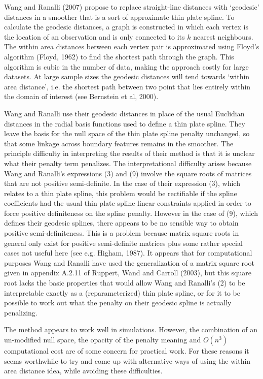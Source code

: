 \documentclass[useAMS, referee]{biom}
\begin{document}
Wang and Ranalli (2007) propose to replace straight-line distances with `geodesic' distances in a smoother that is a sort of approximate thin plate spline. To calculate the geodesic distances, a graph is constructed in which each vertex is the location of an observation and is only connected to its $k$ nearest neighbours. The within area distances between each vertex pair is approximated using  Floyd's algorithm (Floyd, 1962) to find the shortest path through the graph. This algorithm is cubic in the number of data, making the approach costly for large datasets. At large sample sizes the geodesic distances will tend towards `within area distance', i.e. the shortest path between two point that lies entirely within the domain of interest (see Bernstein et al, 2000). 

Wang and Ranalli use their geodesic distances in place of the usual Euclidian distances in the radial basis functions used to define a thin plate spline. They leave the basis for the null space of the thin plate spline penalty unchanged, so that some linkage across boundary features remains in the smoother. The principle difficulty in interpreting the results of their method is that it is unclear what their penalty term penalizes. The interpretational difficulty arises because  Wang and Ranalli's expressions (3) and (9) involve the square roots of matrices that are not positive semi-definite. In the case of their expression (3), which relates to a thin plate spline, this problem would be rectifiable if the spline coefficients had the usual thin plate spline linear constraints applied in order to force positive definiteness on the spline penalty. However in the case of (9), which defines their geodesic splines, there appears to be no sensible way to obtain positive semi-definiteness. This is a problem because matrix square roots in general only exist for positive semi-definite matrices plus some rather special cases not useful here (see e.g. Higham, 1987). It appears that for computational purposes Wang and Ranalli have used the generalization of a matrix square root given in appendix A.2.11 of Ruppert, Wand and Carroll (2003), but this square root lacks the basic properties that would allow Wang and Ranalli's (2) to be interpretable exactly as a (reparameterized) thin plate spline, or for it to be possible to work out what the penalty on their geodesic spline is actually penalizing. 

The method appears to work well in simulations. However, the combination of an un-modified null space, the opacity of the penalty meaning and $O(n^3)$ computational cost are of some concern for practical work. For these reasons it seems worthwhile to try and come up with alternative ways of using the within area distance idea, while avoiding these difficulties. 
\end{document}
